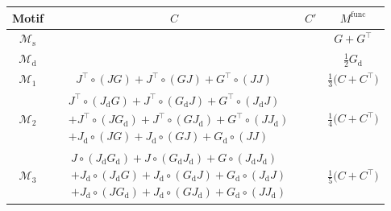 \documentclass[12pt,draft]{ociamthesis}
\theoremstyle{plain}
\theoremstyle{definition}
\theoremstyle{remark}
\newcommand\ca[1]{\mathcal{#1}}
\begin{document}
\vspace*{0.2cm}
\begin{table}[H]

  \centering
  \renewcommand{\arraystretch}{1.8}
  \tiny

  \begin{tabular}{ |c|c|c|c| }

    \hline

    Motif & $C$ & $C'$ & $M^\mathrm{func}$ \\

    \hline

    $\ca{M}_\mathrm{s}$ & & & $G + G^\top$ \\

    \hline

    $\ca{M}_\mathrm{d}$ & & & $\frac{1}{2} G_\mathrm{d}$ \\

    \hline

    $\ca{M}_1$ & $J^\top \circ (J G) + J^\top \circ (G J) + G^\top \circ (J J)$
    & & $\frac{1}{3} \big(C + C^\top\big)$ \\

    \hline

    $\ca{M}_2$ & \rule{0pt}{2.7em}$\displaystyle
    \begin{aligned}
      & J^\top \circ (J_\mathrm{d} G) + J^\top \circ (G_\mathrm{d} J) + G^\top
      \circ (J_\mathrm{d} J) \\
      & + J^\top \circ (J G_\mathrm{d}) + J^\top \circ (G J_\mathrm{d}) +
      G^\top \circ (J J_\mathrm{d}) \\
      & + J_\mathrm{d} \circ (J G) + J_\mathrm{d} \circ (G J) + G_\mathrm{d}
      \circ (J J)
    \end{aligned}
    $\rule[-2em]{0pt}{1em} & & $\frac{1}{4} \big(C + C^\top\big)$ \\

    \hline

    $\ca{M}_3$ & \rule{0pt}{2.7em}$\displaystyle
    \begin{aligned}
      & J \circ (J_\mathrm{d} G_\mathrm{d}) + J \circ (G_\mathrm{d}
      J_\mathrm{d}) + G \circ (J_\mathrm{d} J_\mathrm{d}) \\
      & + J_\mathrm{d} \circ (J_\mathrm{d} G) + J_\mathrm{d} \circ
      (G_\mathrm{d} J) + G_\mathrm{d} \circ (J_\mathrm{d} J) \\
      & + J_\mathrm{d} \circ (J G_\mathrm{d}) + J_\mathrm{d} \circ (G
      J_\mathrm{d}) + G_\mathrm{d} \circ (J J_\mathrm{d})
    \end{aligned}
    $\rule[-2em]{0pt}{1em} & & $\frac{1}{5} \big(C + C^\top\big)$ \\


\end{tabular}
\end{table}
\end{document}
